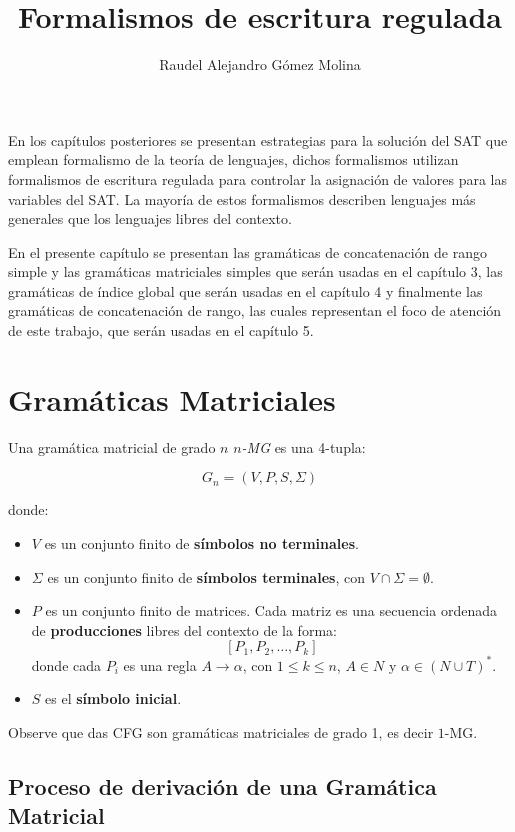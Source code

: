 \documentclass[12pt]{article}
\title{Formalismos de escritura regulada}
\author{Raudel Alejandro Gómez Molina}
\begin{document}
\maketitle

En los capítulos posteriores se presentan estrategias para la solución del SAT que emplean formalismo de la teoría de lenguajes,
dichos formalismos utilizan formalismos de escritura regulada para controlar la asignación de valores para las variables del SAT.
La mayoría de estos formalismos describen lenguajes más generales que los lenguajes libres del contexto.

En el presente capítulo se presentan las gramáticas de concatenación de rango simple y las gramáticas matriciales simples que serán usadas en el capítulo 3, las gramáticas
de índice global que serán usadas en el capítulo 4 y finalmente las gramáticas de concatenación de rango, las cuales
representan el foco de atención de este trabajo, que serán usadas en el capítulo 5.


\section{Gramáticas Matriciales}

Una gramática matricial \cite{simpleMatrixLanguages} de grado $n$ \textit{$n$-MG} es una 4-tupla:

\[
    G_n = (V, P, S,\Sigma)
\]

donde:
\begin{itemize}
    \item \( V \) es un conjunto finito de \textbf{símbolos no terminales}.
    \item \( \Sigma \) es un conjunto finito de \textbf{símbolos terminales}, con \( V \cap \Sigma = \emptyset \).
    \item \( P \) es un conjunto finito de matrices. Cada matriz es una secuencia ordenada de \textbf{producciones} libres del contexto de la forma:
          \[
              [P_1, P_2, \dots, P_k]
          \]
          donde cada \( P_i \) es una regla \( A \to \alpha \), con $1\leq k\leq n$, \( A \in N \) y \( \alpha \in (N \cup T)^* \).
    \item \( S  \) es el \textbf{símbolo inicial}.
\end{itemize}

Observe que das CFG son gramáticas matriciales de grado 1, es decir $1$-MG.

\subsection{Proceso de derivación de una Gramática Matricial}
\end{document}
